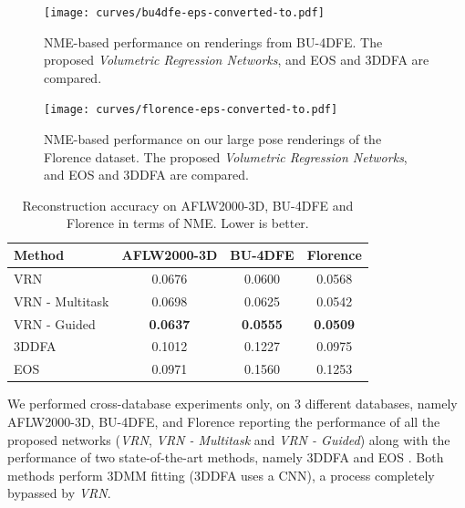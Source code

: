 \begin{figure}
  \centering
  \texttt{[image: curves/bu4dfe-eps-converted-to.pdf]}
  \caption[NME performance on BU-4DFE renderings]{NME-based
    performance on renderings from BU-4DFE. The proposed
    \textit{Volumetric Regression Networks}, and EOS and 3DDFA are
    compared.}
  \label{roc:bu4dfe}
\end{figure}

\begin{figure}
  \centering
  \texttt{[image: curves/florence-eps-converted-to.pdf]}
  \caption[NME performance on Florence renderings]{NME-based
    performance on our large pose renderings of the Florence
    dataset. The proposed \textit{Volumetric Regression Networks}, and
    EOS and 3DDFA are compared.}
  \label{roc:florence}
\end{figure}



\begin{table}
  \caption[Reconstruction accuracy]{Reconstruction accuracy on
    AFLW2000-3D, BU-4DFE and Florence in terms of NME. Lower is
    better.}
  \label{tab:overview}
  \centering
  \small
\begin{tabular}{|l||c|c|c|}
  \hline
  \textbf{Method}   & \textbf{AFLW2000-3D} & \textbf{BU-4DFE} & \textbf{Florence} \\
  \hline\hline
  VRN & 0.0676   & 0.0600 & 0.0568   \\
  VRN - Multitask   & 0.0698        & 0.0625     & 0.0542        \\
  VRN - Guided    & \textbf{0.0637}   & \textbf{0.0555} & \textbf{0.0509}   \\
\hline
  3DDFA~\cite{zhu2016face}             & 0.1012   & 0.1227 & 0.0975   \\
  EOS~\cite{huber2016multiresolution}  & 0.0971   & 0.1560 & 0.1253   \\
  \hline
\end{tabular}
\vspace{-4mm}
\end{table}


We performed cross-database experiments only, on 3 different
databases, namely AFLW2000-3D, BU-4DFE, and Florence reporting the
performance of all the proposed networks (\textit{VRN}, \textit{VRN -
  Multitask} and \textit{VRN - Guided}) along with the performance of
two state-of-the-art methods, namely 3DDFA \cite{zhu2016face} and EOS
\cite{huber2016multiresolution}. Both methods perform 3DMM
fitting (3DDFA uses a CNN), a process completely bypassed by \textit{VRN}.


